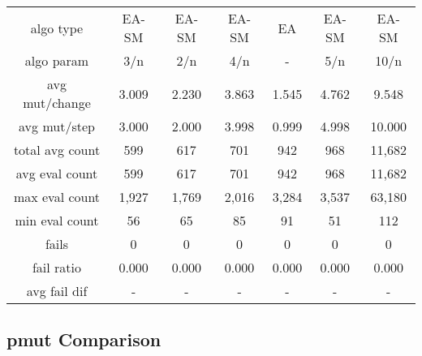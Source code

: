 \begin{tabular}[h]{ccccccc}
algo type&             EA-SM&      EA-SM&      EA-SM&         EA&      EA-SM&      EA-SM\\
algo param&              3/n&        2/n&        4/n&          -&        5/n&       10/n\\
avg mut/change&        3.009&      2.230&      3.863&      1.545&      4.762&      9.548\\
avg mut/step&          3.000&      2.000&      3.998&      0.999&      4.998&     10.000\\
\hline
total avg count&         599&        617&        701&        942&        968&     11,682\\
avg eval count&          599&        617&        701&        942&        968&     11,682\\
max eval count&        1,927&      1,769&      2,016&      3,284&      3,537&     63,180\\
min eval count&           56&         65&         85&         91&         51&        112\\
\hline
fails&                     0&          0&          0&          0&          0&          0\\
fail ratio&            0.000&      0.000&      0.000&      0.000&      0.000&      0.000\\
avg fail dif&              -&          -&          -&          -&          -&          -\\
\end{tabular}


\subsection{pmut Comparison}


